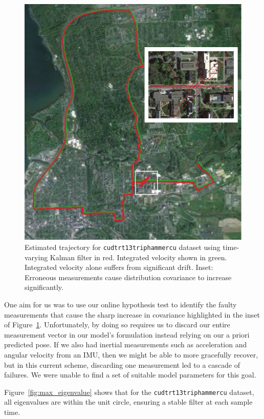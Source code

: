 \begin{figure}[!b]
\includegraphics[width=\columnwidth]{track2_map}
\caption{Estimated trajectory for \texttt{cudtrt13triphammercu} dataset using time-varying Kalman filter in red.  Integrated velocity shown in green.  Integrated velocity alone suffers from significant drift.  Inset: Erroneous measurements cause distribution covariance to increase significantly.}
\label{fig:track2_map}
\end{figure}

One aim for us was to use our online hypothesis test to identify the faulty measurements that cause the sharp increase in covariance highlighted in the inset of Figure~\ref{fig:track2_map}.  Unfortunately, by doing so requires us to discard our entire measurement vector in our model's formulation instead relying on our a priori predicted pose.  If we also had inertial measurements such as acceleration and angular velocity from an IMU, then we might be able to more gracefully recover, but in this current scheme, discarding one measurement led to a cascade of failures.  We were unable to find a set of suitable model parameters for this goal.

Figure~\ref{fig:max_eigenvalue} shows that for the \texttt{cudtrt13triphammercu} dataset, all eigenvalues are within the unit circle, ensuring a stable filter at each sample time.

